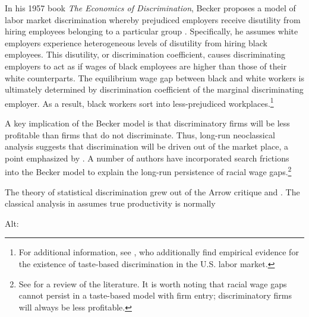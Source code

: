 \documentclass[10 pt]{article}
\begin{document}
\begin{outline}


In his 1957 book \emph{The Economics of Discrimination}, Becker proposes a model of labor market discrimination whereby prejudiced employers receive disutility from hiring employees belonging to a particular group \parencite{B57}.
Specifically, he assumes white employers experience heterogeneous levels of disutility from hiring black employees. 
This disutility, or discrimination coefficient, causes discriminating employers to act as if wages of black employees are higher than those of their white counterparts.
The equilibrium wage gap between black and white workers is ultimately determined by discrimination coefficient of the marginal discriminating employer.
As a result, black workers sort into less-prejudiced workplaces.\footnote{
For additional information, see \textcite{CG08}, who additionally find empirical evidence for the existence of taste-based discrimination in the U.S. labor market.
} 

A key implication of the Becker model is that discriminatory firms will be less profitable than firms that do not discriminate. 
Thus, long-run neoclassical analysis suggests that discrimination will be driven out of the market place, a point emphasized by \textcite{A72}.
A number of authors have incorporated search frictions into the Becker model to explain the long-run persistence of racial wage gaps.\footnote{
    See \textcite{LL12} for a review of the literature.
    It is worth noting that racial wage gaps cannot persist in a taste-based model with firm entry; discriminatory firms will always be less profitable. 
}


The theory of statistical discrimination grew out of the Arrow critique  and \textcite{P72}.
The classical analysis in \textcite{AC77} assumes true productivity is normally 


\end{outline}

Alt: %
\end{document}

